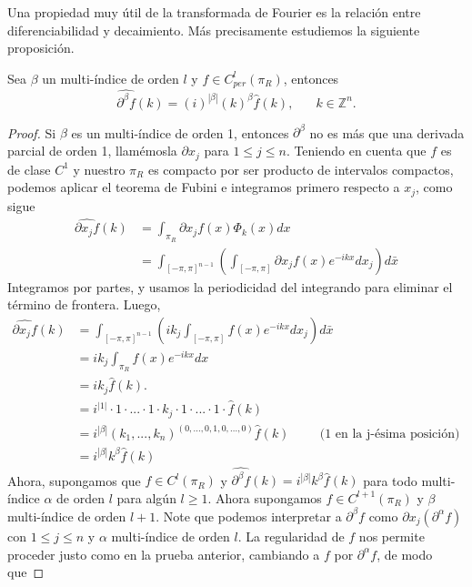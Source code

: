     Una propiedad muy útil de la transformada de Fourier es la relación entre diferenciabilidad y decaimiento. Más precisamente estudiemos la siguiente proposición.
    \begin{proposition}
      Sea $\beta$ un multi-índice de orden $l$ y $f\in C^{l}_{per}(\pi_R)$, entonces
      \begin{equation}
        \hat{\partial^{\beta}f}(k)=(i)^{|\beta|}(k)^{\beta}\hat{f}(k),\phantom{xxx}k\in\mathbb{Z}^{n}.\label{eq:transformada-de-la-derivada} 
      \end{equation}
    \end{proposition}
    \begin{proof}
      Si $\beta$ es un multi-índice de orden 1, entonces $\partial ^{\beta}$ no es más que una derivada parcial de orden 1, llamémosla $\partial x_{j}$ para $1 \leq j \leq n$. Teniendo en cuenta que $f$ es de clase $C^{1}$ y nuestro $\pi_R$ es compacto por ser producto de intervalos compactos, podemos aplicar el teorema de Fubini e integramos primero respecto a $x_{j}$, como sigue 
      \begin{align*}
        \hat{\partial x_{j}f} (k) &= \int_{\pi_R} \partial x_{j} f(x) \Phi _{k}(x) dx\\ 
        &= \int_{[-\pi,\pi]^{n-1}}\left( \int_{[-\pi,\pi]}\partial x_{j} f(x) e^{-ikx}dx_{j} \right)d\bar{x}
      \end{align*}
      Integramos por partes, y usamos la periodicidad del integrando para eliminar el término de frontera. Luego,
      \begin{align*}
        \hat{\partial x_{j}f} (k) &= \int_{[-\pi,\pi]^{n-1}}\left( ik_{j} \int_{[-\pi,\pi]} f(x) e^{-ikx}dx_{j} \right)d\bar{x}\\ 
        &= ik_{j} \int_{\pi_R} f(x)e^{-ikx}dx\\ 
        &= ik_{j} \widehat{f}(k).\\ 
        &= i^{|1|} \cdot 1 \cdot ... \cdot 1 \cdot k_{j} \cdot 1 \cdot ... \cdot 1 \cdot \widehat{f}(k)\\ 
        &= i^{|\beta|} (k_{1},...,k_{n})^{(0,...,0,1,0,...,0)} \widehat{f}(k) \hspace{1cm} \text{(1 en la j-ésima posición) }\\
        &= i^{|\beta|} k^{\beta} \widehat{f}(k)
      \end{align*}
      Ahora, supongamos que $f \in C^{l}(\pi_R)$ y $\hat{\partial^{\beta}f}(k) = i^{|\beta|}k^{\beta}\widehat{f}(k)$ para todo multi-índice $\alpha$ de orden $l$ para algún $ l\geq 1$. Ahora supongamos $f\in C^{l+1}(\pi_R)$ y $\beta$ multi-índice de orden $l+1$. Note que podemos interpretar a $\partial ^{\beta} f$ como $\partial x_{j} (\partial ^{\alpha}f)$ con $1\leq j \leq n$ y  $\alpha$ multi-índice de orden $l$. La regularidad de $f$ nos permite proceder justo como en la prueba anterior, cambiando a $f$ por $\partial^{\alpha}f$, de modo que

\end{proof}
